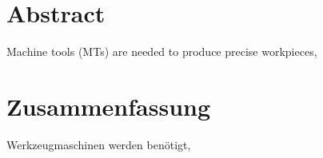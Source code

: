 \chapter*{Abstract}

Machine tools (MTs) are needed to produce precise workpieces, 

\cleardoublepage
\chapter*{Zusammenfassung}

Werkzeugmaschinen werden benötigt,





%
